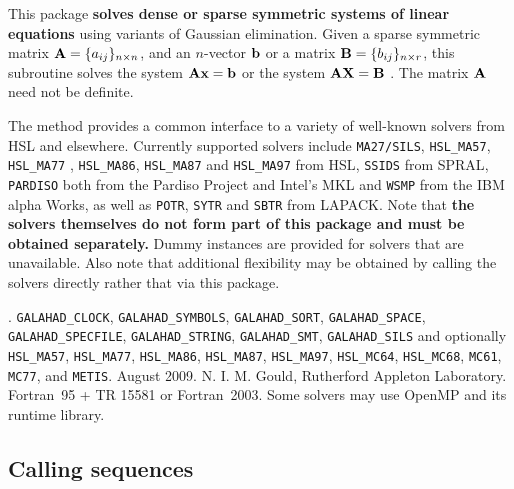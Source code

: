 \documentclass{galahad}
\newcommand{\packagename}{SLS}
\newcommand{\fullpackagename}{\libraryname\_\-\packagename}
\begin{document}
\galheader


\galsummary

This package
{\bf solves dense or sparse symmetric systems of linear equations}
using variants of Gaussian elimination.
Given a sparse symmetric matrix ${\mathbf{A}} = \{ a_{ij} \}_{n \times n}$, and an
$n$-vector ${\mathbf{b}}$ or a matrix ${\mathbf{B}} = \{ b_{ij} \}_{n \times r}$, this
subroutine solves the system ${\mathbf{A}} {\mathbf{x}} = {\mathbf{b}}$ or the system ${\mathbf{A}}
{\mathbf{X}} = {\mathbf{B}}$ . The matrix ${\mathbf{A}}$ need not be definite.

\noindent The method provides a common interface to a variety of well-known
solvers from HSL and elsewhere. Currently supported solvers include
{\tt MA27/SILS}, {\tt HSL\_MA57}, {\tt HSL\_MA77} , {\tt HSL\_MA86},
{\tt HSL\_MA87} and {\tt HSL\_MA97} from {HSL},
{\tt SSIDS} from {SPRAL},
{\tt PARDISO} both from the Pardiso Project and Intel's MKL
and {\tt WSMP} from the IBM alpha Works, as
well as {\tt POTR}, {\tt SYTR} and {\tt SBTR} from LAPACK.
Note that
{\bf the solvers themselves do not form part of this package and
must be obtained separately.}
Dummy instances are provided for solvers that are unavailable.
Also note that additional flexibility may be obtained by calling the
solvers directly rather that via this package.


\galattributes
\galversions{\tt  \fullpackagename\_single, \fullpackagename\_double}.
\galcalls
{\tt GALAHAD\_CLOCK},
{\tt GALAHAD\-\_SYMBOLS},
{\tt GALAHAD\_\-SORT},
{\tt GALAHAD\_SPACE},
{\tt GALAHAD\_SPECFILE},
{\tt GALAHAD\_STRING},
{\tt GALAHAD\_SMT},
{\tt GALAHAD\_SILS}
and optionally
{\tt HSL\_\-MA57},
{\tt HSL\_MA77},
{\tt HSL\_MA86},
{\tt HSL\_MA87},
{\tt HSL\_MA97},
{\tt HSL\_MC64},
{\tt HSL\_MC68},
{\tt MC61},
{\tt MC77},
and {\tt METIS}.
\galdate August 2009.
\galorigin N. I. M. Gould, Rutherford Appleton Laboratory.
\gallanguage Fortran~95 + TR 15581 or Fortran~2003.
\galparallelism Some solvers may use OpenMP and its runtime library.


\galhowto

\subsection{Calling sequences}
\end{document}
